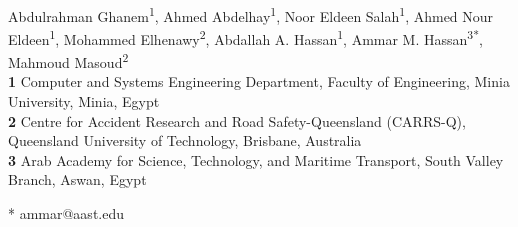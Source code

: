 \documentclass[10pt,letterpaper]{article}
\begin{document}
\vspace*{0.2in}

\begin{flushleft}
{\Large
\textbf{} %
}
\newline
\\
Abdulrahman Ghanem\textsuperscript{1},
Ahmed Abdelhay\textsuperscript{1},
Noor Eldeen Salah\textsuperscript{1},
Ahmed Nour Eldeen\textsuperscript{1},
Mohammed Elhenawy\textsuperscript{2},
Abdallah A. Hassan\textsuperscript{1},
Ammar M. Hassan\textsuperscript{3*},
Mahmoud Masoud\textsuperscript{2}
\\
\bigskip
\textbf{1} Computer and Systems Engineering Department, Faculty of Engineering, Minia University, Minia, Egypt
\\
\textbf{2}  Centre for Accident Research and Road Safety-Queensland (CARRS-Q), Queensland University of Technology, Brisbane, Australia
\\
\textbf{3} Arab Academy for Science, Technology, and Maritime Transport, South Valley Branch, Aswan, Egypt
\\
\bigskip

% 
%





* ammar@aast.edu

\end{flushleft}
\end{document}
